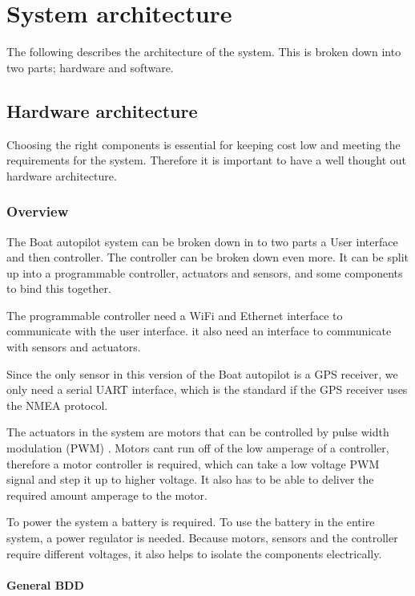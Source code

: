 \chapter{System architecture}
\label{sec:sys-architecture}
The following describes the architecture of the system. This is broken down into two parts; hardware and software.

\section{Hardware architecture}
Choosing the right components is essential for keeping cost low and meeting the requirements for the system. Therefore it is important to have a well thought out hardware architecture. 

\subsection{Overview}
The Boat autopilot system can be broken down in to two parts a User interface and then controller.
The controller can be broken down even more. It can be split up into a programmable controller, actuators and sensors, and some components to bind this together.

The programmable controller need a WiFi and Ethernet interface to communicate with the user interface. it also need an interface to communicate with sensors and actuators. 

Since the only sensor in this version of the Boat autopilot is a GPS receiver, we only need a serial UART interface, which is the standard if the GPS receiver uses the NMEA protocol. 

The actuators in the system are motors that can be controlled by pulse width modulation (PWM) \cite{PWM}. Motors cant run off of the low amperage of a controller, therefore a motor controller is required, which can take a low voltage PWM signal and step it up to higher voltage. It also has to be able to deliver the required amount amperage to the motor. 

To power the system a battery is required. To use the battery in the entire system, a power regulator is needed. Because motors, sensors and the controller require different voltages, it also helps to isolate the components electrically.

\subsubsection{General BDD}

